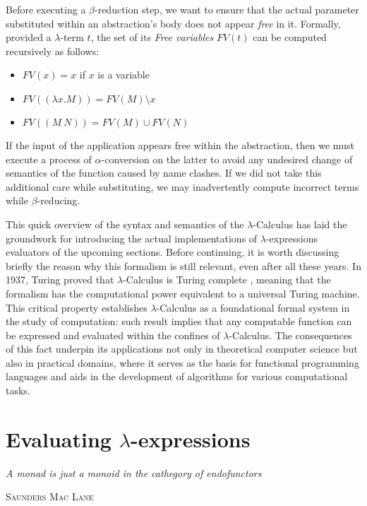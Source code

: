 \documentclass{article}
\begin{document}
Before executing a $\beta$-reduction step, we want to ensure that the actual parameter substituted within an abstraction's body does not appear \textit{free} in it. Formally, provided a $\lambda$-term $t$, the set of its \textit{Free variables} $FV(t)$ can be computed recursively as follows:

\begin{itemize}
    \item $FV(x) = x$ if $x$ is a variable
    \item $FV((\lambda x . M)) = FV(M) \setminus x$
    \item $FV((M\ N)) = FV(M) \cup FV(N)$
\end{itemize}

If the input of the application appears free within the abstraction, then we must execute a process of $\alpha$-conversion on the latter to avoid any undesired change of semantics of the function caused by name clashes. If we did not take this additional care while substituting, we may inadvertently compute incorrect terms while $\beta$-reducing.

This quick overview of the syntax and semantics of the $\lambda$-Calculus has laid the groundwork for introducing the actual implementations of $\lambda$-expressions evaluators of the upcoming sections. Before continuing, it is worth discussing briefly the reason why this formalism is still relevant, even after all these years. In 1937, Turing proved that $\lambda$-Calculus is Turing complete \cite{turing}, meaning that the formalism has the computational power equivalent to a universal Turing machine. This critical property establishes $\lambda$-Calculus as a foundational formal system in the study of computation: such result implies that any computable function can be expressed and evaluated within the confines of $\lambda$-Calculus. The consequences of this fact underpin its applications not only in theoretical computer science but also in practical domains, where it serves as the basis for functional programming languages and aids in the development of algorithms for various computational tasks.

\section{Evaluating $\lambda$-expressions}\label{sec:evaluation}

\epigraph{\textit{A monad is just a monoid in the cathegory of endofunctors}}{\textsc{Saunders Mac Lane}\cite{mac}}
\end{document}
